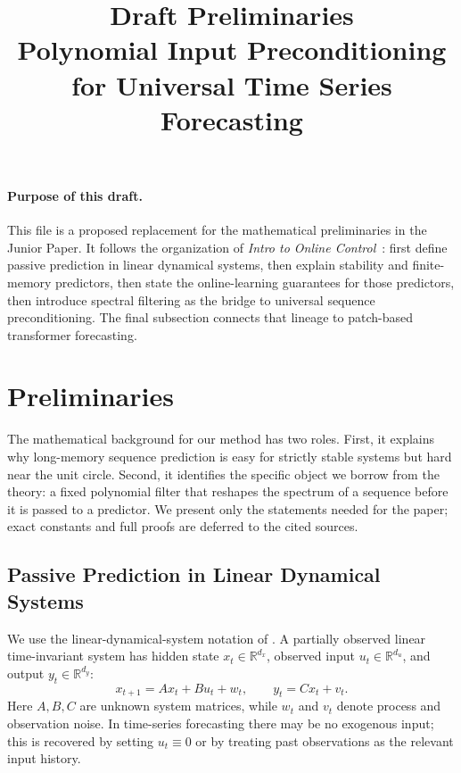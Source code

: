 \documentclass[11pt]{article}
\title{\textbf{Draft Preliminaries}\\
\large Polynomial Input Preconditioning for Universal Time Series Forecasting}
\author{}
\date{}
\theoremstyle{plain}
\theoremstyle{definition}
\theoremstyle{remark}
\newcommand{\R}{\mathbb{R}}
\begin{document}
\maketitle

\paragraph{Purpose of this draft.}
This file is a proposed replacement for the mathematical preliminaries in the Junior Paper. It follows the organization of \emph{Intro to Online Control}~\citep{hazan2025onlinecontrol}: first define passive prediction in linear dynamical systems, then explain stability and finite-memory predictors, then state the online-learning guarantees for those predictors, then introduce spectral filtering as the bridge to universal sequence preconditioning. The final subsection connects that lineage to patch-based transformer forecasting.

\section{Preliminaries}
\label{sec:preliminaries-draft}

The mathematical background for our method has two roles. First, it explains why long-memory sequence prediction is easy for strictly stable systems but hard near the unit circle. Second, it identifies the specific object we borrow from the theory: a fixed polynomial filter that reshapes the spectrum of a sequence before it is passed to a predictor. We present only the statements needed for the paper; exact constants and full proofs are deferred to the cited sources.

\subsection{Passive Prediction in Linear Dynamical Systems}
\label{sec:passive-lds}

We use the linear-dynamical-system notation of \citet[Chs.~4 and~9]{hazan2025onlinecontrol}. A partially observed linear time-invariant system has hidden state $x_t \in \R^{d_x}$, observed input $u_t \in \R^{d_u}$, and output $y_t \in \R^{d_y}$:
\begin{equation}
    x_{t+1} = A x_t + B u_t + w_t,
    \qquad
    y_t = C x_t + v_t .
    \label{eq:lds-input-output}
\end{equation}
Here $A,B,C$ are unknown system matrices, while $w_t$ and $v_t$ denote process and observation noise. In time-series forecasting there may be no exogenous input; this is recovered by setting $u_t \equiv 0$ or by treating past observations as the relevant input history.
\end{document}
